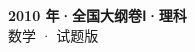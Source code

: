 \documentclass[zihao=-4, a4paper]{ctexart}
\begin{document}
\begin{center}
  {\Large\bfseries 2010 年·全国大纲卷Ⅰ·理科}\\[4pt]
  {\large 数学 · 试题版}
\end{center}
\medskip
{}

\end{document}
